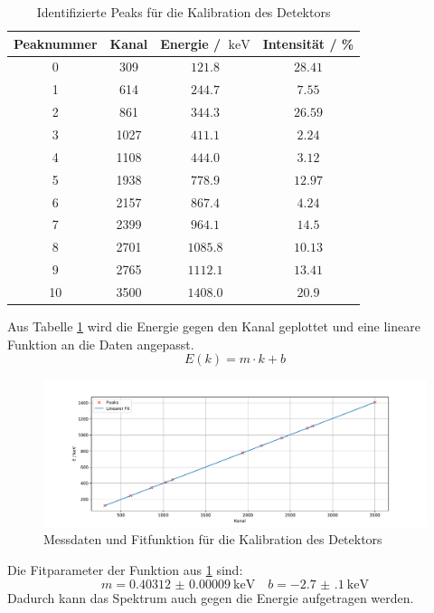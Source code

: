 \begin{table}
  \centering
  \caption{Identifizierte Peaks für die Kalibration des Detektors}
  \label{tab:peaks_01}
  \begin{tabular}{c c c c}
    \toprule
    Peaknummer&Kanal&Energie / $\SI{}{\kilo\eV}$&Intensität / \%\\
    \midrule
    0  &309   &$\num{121.8}$&$\num{28.41}$\\
    1   &614   &$\num{244.7}$&$\num{7.55}$\\
    2   &861   &$\num{344.3}$&$\num{26.59}$\\
    3   &1027  &$\num{411.1}$&$\num{2.24}$\\
    4   &1108  &$\num{444.0}$&$\num{3.12}$\\
    5   &1938  &$\num{778.9}$&$\num{12.97}$\\
    6   &2157  &$\num{867.4}$&$\num{4.24}$\\
    7   &2399  &$\num{964.1}$&$\num{14.5}$\\
    8   &2701  &$\num{1085.8}$&$\num{10.13}$\\
    9  &2765  &$\num{1112.1}$&$\num{13.41}$\\
    10  &3500  &$\num{1408.0}$&$\num{20.9}$\\
    \bottomrule
  \end{tabular}
\end{table}
Aus Tabelle \ref{tab:peaks_01} wird die Energie gegen den Kanal geplottet und eine lineare Funktion an die Daten 
angepasst.
\begin{equation*}
  \label{eq:linear}
  E(k) = m\cdot k + b
\end{equation*}
\FloatBarrier
\begin{figure}
  \centering
  \includegraphics[width=\textwidth,keepaspectratio]{figure/Lin_Fit_01.pdf}
  \caption{Messdaten und Fitfunktion für die Kalibration des Detektors}
  \label{fig:Lin_Fit:01}
\end{figure}
\FloatBarrier
Die Fitparameter der Funktion aus \ref{fig:Lin_Fit:01} sind:
\begin{equation*}
  m = \SI{0.40312(9)}{\kilo\eV} \quad b = \SI{-2.7(1)}{\kilo\eV}
\end{equation*}
Dadurch kann das Spektrum auch gegen die Energie aufgetragen werden.

